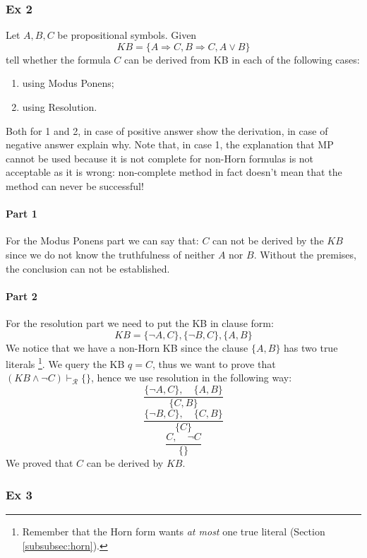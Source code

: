 \documentclass[10pt,a4paper]{article}
\begin{document}
\subsubsection{Ex 2}
Let $A, B, C$ be propositional symbols. Given
\[KB=\{A\Rightarrow C, B\Rightarrow C, A\vee B\}\]
tell whether the formula $C$ can be derived from KB in each of the following cases:
\begin{enumerate}
\item  using Modus Ponens;
\item  using Resolution.
\end{enumerate}

Both for 1 and 2, in case of positive answer show the derivation, in case of negative answer explain why.
Note that, in case 1, the explanation that MP cannot be used because it is not complete for non-Horn formulas is not acceptable as it is wrong: non-complete method in fact doesn’t mean that the method can never be successful!\\

\paragraph{Part 1}
For the Modus Ponens part we can say that: $C$ can not be derived by the $KB$ since we do not know the truthfulness of neither $A$ nor $B$. Without the premises, the conclusion can not be established.

\paragraph{Part 2}

For the resolution part we need to  put the KB in clause form:
\[KB= \{\neg A,C\},\{\neg B,C\},\{A,B\}\]
We notice that we have a non-Horn KB since the clause $\lbrace A,B \rbrace$ has two true literals \footnote{Remember that the Horn form wants \textit{at most} one true literal (Section \ref{subsubsec:horn}).}. We query the KB $q=C$, thus we want to prove that $(KB \wedge \neg C)\vdash_{\mathcal{R}}\lbrace\rbrace$, hence we use resolution in the following way:
\[\frac{\lbrace \neg A,C\rbrace,\quad \lbrace  A,B \rbrace}{\{C,B\}}\]
\[\frac{\lbrace \neg B,C\rbrace,\quad \lbrace  C,B \rbrace}{\{C\}}\]
\[\frac{ C,\quad \neg C }{\{\}}\]
We proved that $C$  can be derived by $KB$.

\subsubsection{Ex 3}
\end{document}
